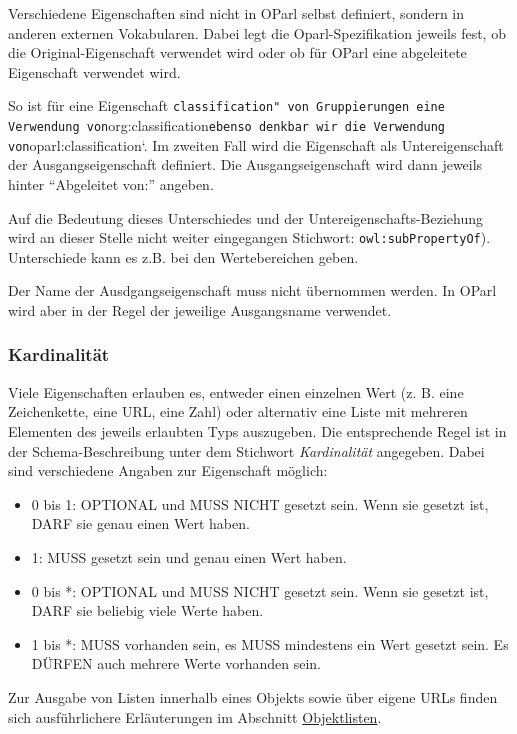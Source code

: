 \documentclass[,a4paper]{article}
\begin{document}
Verschiedene Eigenschaften sind nicht in OParl selbst definiert, sondern
in anderen externen Vokabularen. Dabei legt die Oparl-Spezifikation
jeweils fest, ob die Original-Eigenschaft verwendet wird oder ob für
OParl eine abgeleitete Eigenschaft verwendet wird.

So ist für eine Eigenschaft
\texttt{classification" von Gruppierungen eine Verwendung von}org:classification\texttt{ebenso denkbar wir die Verwendung von}oparl:classification`.
Im zweiten Fall wird die Eigenschaft als Untereigenschaft der
Ausgangseigenschaft definiert. Die Ausgangseigenschaft wird dann jeweils
hinter ``Abgeleitet von:'' angeben.

Auf die Bedeutung dieses Unterschiedes und der
Untereigenschafts-Beziehung wird an dieser Stelle nicht weiter
eingegangen Stichwort: \texttt{owl:subPropertyOf}). Unterschiede kann es
z.B. bei den Wertebereichen geben.

Der Name der Ausdgangseigenschaft muss nicht übernommen werden. In OParl
wird aber in der Regel der jeweilige Ausgangsname verwendet.

\subsubsection{Kardinalität}\label{kardinalituxe4t}

Viele Eigenschaften erlauben es, entweder einen einzelnen Wert (z. B.
eine Zeichenkette, eine URL, eine Zahl) oder alternativ eine Liste mit
mehreren Elementen des jeweils erlaubten Typs auszugeben. Die
entsprechende Regel ist in der Schema-Beschreibung unter dem Stichwort
\emph{Kardinalität} angegeben. Dabei sind verschiedene Angaben zur
Eigenschaft möglich:

\begin{itemize}
\item
  0 bis 1: OPTIONAL und MUSS NICHT gesetzt sein. Wenn sie gesetzt ist,
  DARF sie genau einen Wert haben.
\item
  1: MUSS gesetzt sein und genau einen Wert haben.
\item
  0 bis *: OPTIONAL und MUSS NICHT gesetzt sein. Wenn sie gesetzt ist,
  DARF sie beliebig viele Werte haben.
\item
  1 bis *: MUSS vorhanden sein, es MUSS mindestens ein Wert gesetzt
  sein. Es DÜRFEN auch mehrere Werte vorhanden sein.
\end{itemize}

Zur Ausgabe von Listen innerhalb eines Objekts sowie über eigene URLs
finden sich ausführlichere Erläuterungen im Abschnitt
\hyperref[objektlisten]{Objektlisten}.
\end{document}
